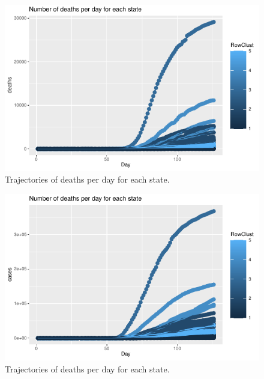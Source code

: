 \documentclass[12pt,a4paper]{article}
\begin{document}
\begin{figure}[H]
	\begin{center}
		\includegraphics{Trajectories_deaths.pdf}
		\caption{Trajectories of deaths per day for each state.}
		\label{fig14}
	\end{center}
\end{figure}


\begin{figure}[H]
	\begin{center}
		\includegraphics{Trajectories_cases.pdf}
		\caption{Trajectories of deaths per day for each state.}
		\label{fig15}
	\end{center}
\end{figure}
\end{document}

